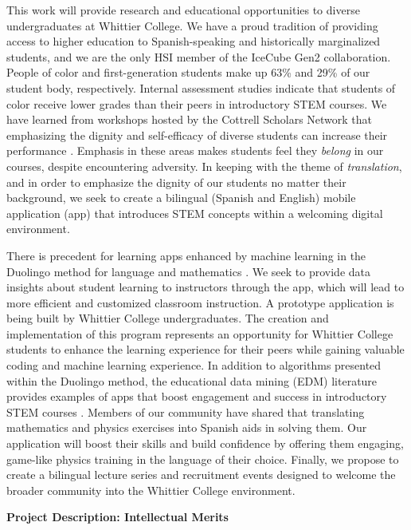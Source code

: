 \documentclass[10pt]{amsart}
\theoremstyle{definition}
\numberwithin{equation}{section}
\begin{document}
This work will provide research and educational opportunities to diverse undergraduates at Whittier College.  We have a proud tradition of providing access to higher education to Spanish-speaking and historically marginalized students, and we are the only HSI member of the IceCube Gen2 collaboration.  People of color and first-generation students make up 63\% and 29\% of our student body, respectively.  Internal assessment studies indicate that students of color receive lower grades than their peers in introductory STEM courses.  We have learned from workshops hosted by the Cottrell Scholars Network that emphasizing the dignity and self-efficacy of diverse students can increase their performance \cite{cottrell1,cottrell2}.  Emphasis in these areas makes students feel they \textit{belong} in our courses, despite encountering adversity. In keeping with the theme of \textit{translation}, and in order to emphasize the dignity of our students no matter their background, we seek to create a bilingual (Spanish and English) mobile application (app) that introduces STEM concepts within a welcoming digital environment.

There is precedent for learning apps enhanced by machine learning in the Duolingo method for language and mathematics \cite{duolingo_whitepaper}. We seek to provide data insights about student learning to instructors through the app, which will lead to more efficient and customized classroom instruction.  A prototype application is being built by Whittier College undergraduates.  The creation and implementation of this program represents an opportunity for Whittier College students to enhance the learning experience for their peers while gaining valuable coding and machine learning experience.  In addition to algorithms presented within the Duolingo method, the educational data mining (EDM) literature provides examples of apps that boost engagement and success in introductory STEM courses \cite{edm1,edm2,edm3,edm4}.  Members of our community have shared that translating mathematics and physics exercises into Spanish aids in solving them.  Our application will boost their skills and build confidence by offering them engaging, game-like physics training in the language of their choice.  Finally, we propose to create a bilingual lecture series and recruitment events designed to welcome the broader community into the Whittier College environment.

\clearpage

\centerline{\bf \Large Project Description: Intellectual Merits}
\setcounter{section}{0}
\linespacing
\end{document}
